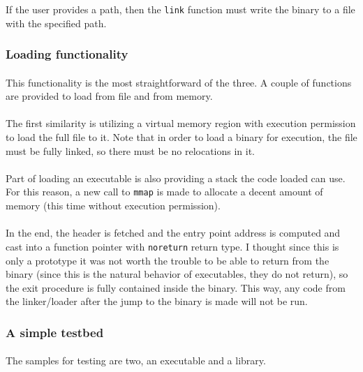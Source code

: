 \documentclass[12pt]{article}
\begin{document}
	If the user provides a path, then the \verb|link| function must write the binary to a file with the specified path.
	
	\subsubsection{Loading functionality}
	\paragraph{}This functionality is the most straightforward of the three. A couple of functions are provided to load from file and from memory.
	\paragraph{}The first similarity is utilizing a virtual memory region with execution permission to load the full file to it. Note that in order to load a binary for execution, the file must be fully linked, so there must be no relocations in it.
	\paragraph{}Part of loading an executable is also providing a stack the code loaded can use. For this reason, a new call to \verb|mmap| is made to allocate a decent amount of memory (this time without execution permission).
	\paragraph{}In the end, the header is fetched and the entry point address is computed and cast into a function pointer with \verb|noreturn| return type. I thought since this is only a prototype it was not worth the trouble to be able to return from the binary (since this is the natural behavior of executables, they do not return), so the exit procedure is fully contained inside the binary. This way, any code from the linker/loader after the jump to the binary is made will not be run.
	
	\subsubsection{A simple testbed}
	\paragraph{}The samples for testing are two, an executable and a library.
\end{document}
